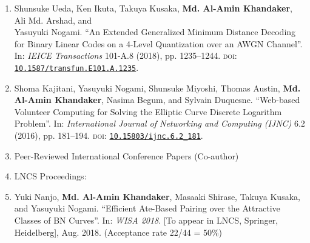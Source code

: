 \begin{enumerate}
	\item Shunsuke Ueda, Ken Ikuta, Takuya Kusaka, \textbf{Md. Al-Amin Khandaker}, Ali Md. Arshad, and \\ Yasuyuki Nogami. ``An Extended Generalized Minimum Distance Decoding for Binary Linear Codes on a 4-Level Quantization over an AWGN Channel”. In: \textit{IEICE Transactions} 101-A.8 (2018), pp. 1235–1244. \textsc{doi}: \href{https://doi.org/10.1587/transfun.E101.A.1235}{\texttt{10.1587/transfun.E101.A.1235}}.
	
	\item Shoma Kajitani, Yasuyuki Nogami, Shunsuke Miyoshi, Thomas Austin, \textbf{Md. Al-Amin Khandaker}, Nasima Begum, and Sylvain Duquesne. “Web-based Volunteer Computing for Solving the Elliptic Curve Discrete Logarithm Problem”. In: \textit{International Journal of Networking and Computing (IJNC) }6.2 (2016), pp. 181–194. \textsc{doi}: \href{https://doi.org/10.15803/ijnc.6.2_181}{\texttt{10.15803/ijnc.6.2\_181}}.
	
	\vspace{10mm}
	\Large
	\item[] Peer-Reviewed International Conference Papers  (Co-author)
	\item[ ] \Large LNCS Proceedings:
	\normalsize
	\item Yuki Nanjo, \textbf{Md. Al-Amin Khandaker}, Masaaki Shirase, Takuya Kusaka, and Yasuyuki Nogami. ``Efficient Ate-Based Pairing over the Attractive Classes of BN Curves''. In: \textit{WISA 2018}. [To appear in LNCS, Springer, Heidelberg],  Aug. 2018.
	(Acceptance rate 22/44 = 50\%)
	

\end{enumerate}

